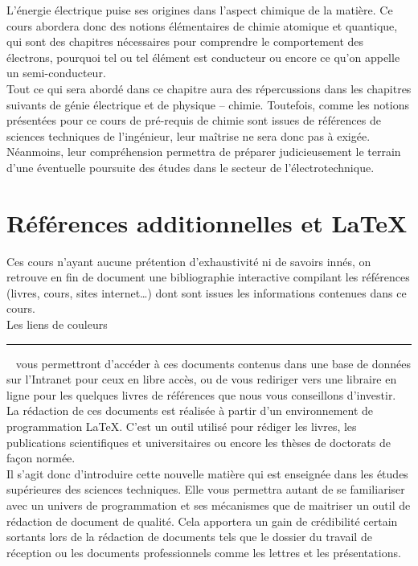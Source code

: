 L'énergie électrique puise ses origines dans l'aspect chimique de la matière. Ce cours abordera donc des notions élémentaires de chimie atomique et quantique, qui sont des chapitres nécessaires pour comprendre le comportement des électrons, pourquoi tel ou tel élément est conducteur ou encore ce qu'on appelle un semi-conducteur.\\Tout ce qui sera abordé dans ce chapitre aura des répercussions dans les chapitres suivants de génie électrique et de physique -- chimie. Toutefois, comme les notions présentées pour ce cours de pré-requis de chimie sont issues de références de sciences techniques de l'ingénieur, leur maîtrise ne sera donc pas à exigée. Néanmoins, leur compréhension permettra de préparer judicieusement le terrain d'une éventuelle poursuite des études dans le secteur de l'électrotechnique.


\section{Références additionnelles et \textrm{\LaTeX}}

Ces cours n'ayant aucune prétention d'exhaustivité ni de savoirs innés, on retrouve en fin de document une bibliographie interactive compilant les références (livres, cours, sites internet\ldots) dont sont issues les informations contenues dans ce cours.\\Les liens de couleurs ~\textcolor{Blue}{\rule{1.5em}{1.2ex}}~ vous permettront d'accéder à ces documents contenus dans une base de données sur l'Intranet pour ceux en libre accès, ou de vous rediriger vers une libraire en ligne pour les quelques livres de références que nous vous conseillons d'investir.\\

La rédaction de ces documents est réalisée à partir d'un environnement de programmation \LaTeX. C'est un outil utilisé pour rédiger les livres, les publications scientifiques et universitaires ou encore les thèses de doctorats de façon normée.\\Il s'agit donc d'introduire cette nouvelle matière qui est enseignée dans les études supérieures des sciences techniques. Elle vous permettra autant de se familiariser avec un univers de programmation et ses mécanismes que de maitriser un outil de rédaction de document de qualité. Cela apportera un gain de crédibilité certain sortants lors de la rédaction de documents tels que le dossier du travail de réception ou les documents professionnels comme les lettres et les présentations.

